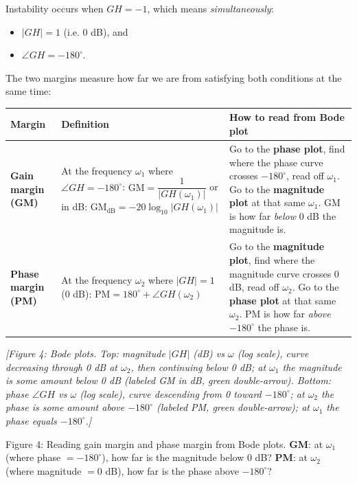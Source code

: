 \documentclass[11pt]{article}
\begin{document}
Instability occurs when $GH = -1$, which means \textit{simultaneously}:
\begin{itemize}
  \item $\lvert GH \rvert = 1$ (i.e. 0 dB), and
  \item $\angle GH = -180^\circ$.
\end{itemize}

The two margins measure how far we are from satisfying both conditions at the same time:

\begin{center}
\begin{tabular}{|l|l|l|}
\hline
\textbf{Margin} & \textbf{Definition} & \textbf{How to read from Bode plot} \\
\hline
\textbf{Gain margin (GM)} & At the frequency $\omega_1$ where $\angle GH = -180^\circ$: $\mathrm{GM} = \dfrac{1}{\lvert GH(\omega_1) \rvert}$ or in dB: $\mathrm{GM}_{\mathrm{dB}} = -20\log_{10}\lvert GH(\omega_1)\rvert$ & Go to the \textbf{phase plot}, find where the phase curve crosses $-180^\circ$, read off $\omega_1$. Go to the \textbf{magnitude plot} at that same $\omega_1$. GM is how far \textit{below} 0 dB the magnitude is. \\
\hline
\textbf{Phase margin (PM)} & At the frequency $\omega_2$ where $\lvert GH \rvert = 1$ (0 dB): $\mathrm{PM} = 180^\circ + \angle GH(\omega_2)$ & Go to the \textbf{magnitude plot}, find where the magnitude curve crosses 0 dB, read off $\omega_2$. Go to the \textbf{phase plot} at that same $\omega_2$. PM is how far \textit{above} $-180^\circ$ the phase is. \\
\hline
\end{tabular}
\end{center}

\textit{[Figure 4: Bode plots. Top: magnitude $\lvert GH \rvert$ (dB) vs $\omega$ (log scale), curve decreasing through 0 dB at $\omega_2$, then continuing below 0 dB; at $\omega_1$ the magnitude is some amount below 0 dB (labeled GM in dB, green double-arrow). Bottom: phase $\angle GH$ vs $\omega$ (log scale), curve descending from 0\textdegree{} toward $-180^\circ$; at $\omega_2$ the phase is some amount above $-180^\circ$ (labeled PM, green double-arrow); at $\omega_1$ the phase equals $-180^\circ$.]}

Figure 4: Reading gain margin and phase margin from Bode plots. \textbf{GM}: at $\omega_1$ (where phase $= -180^\circ$), how far is the magnitude below 0 dB? \textbf{PM}: at $\omega_2$ (where magnitude $= 0$ dB), how far is the phase above $-180^\circ$?
\end{document}

